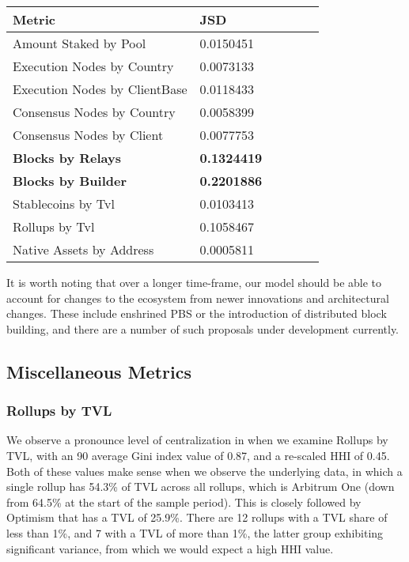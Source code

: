 \documentclass[conference]{IEEEtran}
\begin{document}
\begin{center}
\begin{tabular*}{\linewidth}{@{\extracolsep{\fill}} llllll }
\hline
\textbf{Metric} & \textbf{JSD} \\ \hline
Amount Staked by Pool & 0.0150451 \\
Execution Nodes by Country & 0.0073133 \\
Execution Nodes by ClientBase & 0.0118433 \\
Consensus Nodes by Country & 0.0058399 \\
Consensus Nodes by Client & 0.0077753 \\
\textbf{Blocks by Relays} & \textbf{0.1324419} \\
\textbf{Blocks by Builder} & \textbf{0.2201886} \\
Stablecoins by Tvl & 0.0103413 \\
Rollups by Tvl & 0.1058467 \\
Native Assets by Address & 0.0005811 \\ \hline
\end{tabular*}
\end{center}

\vspace{8pt}

It is worth noting that over a longer time-frame, our model should be able to account for changes to the ecosystem from newer innovations and architectural changes.  These include enshrined PBS or the introduction of distributed block building, and there are a number of such proposals under development currently.

\subsection{Miscellaneous Metrics}

\subsubsection{Rollups by TVL}

We observe a pronounce level of centralization in when we examine Rollups by TVL, with an 90 average Gini index value of 0.87, and a re-scaled HHI of 0.45.  Both of these values make sense when we observe the underlying data, in which a single rollup has 54.3\% of TVL across all rollups, which is Arbitrum One (down from 64.5\% at the start of the sample period).  This is closely followed by Optimism that has a TVL of 25.9\%.  There are 12 rollups with a TVL share of less than 1\%, and 7 with a TVL of more than 1\%, the latter group exhibiting significant variance, from which we would expect a high HHI value.
\end{document}
